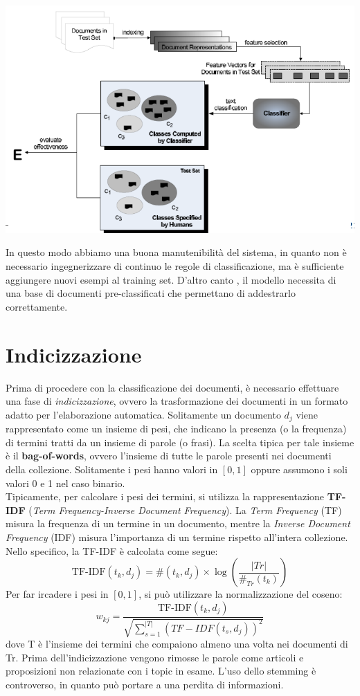 \documentclass{report}
\begin{document}
	\begin{center}
		\includegraphics[scale=0.3]{assets/supervised-learning-testing.png}
	\end{center}
	In questo modo abbiamo una buona manutenibilità del sistema, in quanto non è necessario ingegnerizzare di continuo le regole di classificazione, ma è sufficiente aggiungere nuovi esempi al training set. D'altro canto , il modello necessita di una base di documenti pre-classificati che permettano di addestrarlo correttamente.

	\section{Indicizzazione}
	Prima di procedere con la classificazione dei documenti, è necessario effettuare una fase di \textit{indicizzazione}, ovvero la trasformazione dei documenti in un formato adatto per l'elaborazione automatica. Solitamente un documento $d_j$ viene rappresentato come un insieme di pesi, che indicano la presenza (o la frequenza) di termini tratti da un insieme di parole (o frasi). La scelta tipica per tale insieme è il \textbf{bag-of-words}, ovvero l'insieme di tutte le parole presenti nei documenti della collezione. Solitamente i pesi hanno valori in $[0,1]$ oppure assumono i soli valori 0 e 1 nel caso binario.
	\vspace{\baselineskip}\\
	Tipicamente, per calcolare i pesi dei termini, si utilizza la rappresentazione \textbf{TF-IDF} (\textit{Term Frequency-Inverse Document Frequency}). La \textit{Term Frequency} (TF) misura la frequenza di un termine in un documento, mentre la \textit{Inverse Document Frequency} (IDF) misura l'importanza di un termine rispetto all'intera collezione. Nello specifico, la TF-IDF è calcolata come segue:
	\[
		\text{TF-IDF}(t_k, d_j) = \#(t_k, d_j) \times \log\left(\frac{|Tr|}{\#_{Tr}(t_k)}\right)
	\]
	Per far ircadere i pesi in $[0,1]$, si può utilizzare la normalizzazione del coseno:
	\[
		w_{kj} = \frac{\text{TF-IDF}(t_k, d_j)}{\sqrt{\sum_{s=1}^{|T|} (TF-IDF(t_s, d_j))^2}}
	\]
	dove T è l'insieme dei termini che compaiono almeno una volta nei documenti di Tr. Prima dell'indicizzazione vengono rimosse le parole come articoli e proposizioni non relazionate con i topic in esame. L'uso dello stemming è controverso, in quanto può portare a una perdita di informazioni.
\end{document}
